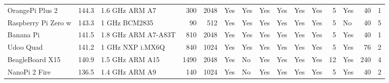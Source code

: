 \begin{table}
{\begin{tabular}{lrlrrllllllrlrr}
    OrangePi Plus 2 & \cellcolor[rgb]{ .914,  .898,  .514}144.3 & 1.6 GHz ARM A7 & 300   & 2048  & \cellcolor[rgb]{ .573,  .816,  .314}Yes & \cellcolor[rgb]{ .573,  .816,  .314}Yes & \cellcolor[rgb]{ .573,  .816,  .314}Yes & \cellcolor[rgb]{ .573,  .816,  .314}Yes & \cellcolor[rgb]{ .573,  .816,  .314}Yes & \cellcolor[rgb]{ .573,  .816,  .314}Yes & 5     & \cellcolor[rgb]{ .573,  .816,  .314}Yes & 40    & 1 \\
    \rowcolor[rgb]{ .851,  .851,  .851} Raspberry Pi Zero w & \cellcolor[rgb]{ .941,  .906,  .518}143.3 & 1 GHz BCM2835 & 90    & 512   & \cellcolor[rgb]{ .573,  .816,  .314}Yes & \cellcolor[rgb]{ .573,  .816,  .314}Yes & \cellcolor[rgb]{ .573,  .816,  .314}Yes & \cellcolor[rgb]{ .573,  .816,  .314}Yes & \cellcolor[rgb]{ .573,  .816,  .314}Yes & \cellcolor[rgb]{ .573,  .816,  .314}Yes & 5     & No    & 40    & 5 \\
    Banana Pi & \cellcolor[rgb]{ .996,  .922,  .518}141.5 & 1.8 GHz ARM A7-A83T & 810   & 2048  & \cellcolor[rgb]{ .573,  .816,  .314}Yes & \cellcolor[rgb]{ .573,  .816,  .314}Yes & \cellcolor[rgb]{ .573,  .816,  .314}Yes & \cellcolor[rgb]{ .573,  .816,  .314}Yes & \cellcolor[rgb]{ .573,  .816,  .314}Yes & \cellcolor[rgb]{ .573,  .816,  .314}Yes & 5     & \cellcolor[rgb]{ .573,  .816,  .314}Yes & 40    & 1 \\
    \rowcolor[rgb]{ .851,  .851,  .851} Udoo Quad & \cellcolor[rgb]{ .996,  .918,  .514}141.2 & 1 GHz NXP i.MX6Q & 840   & 1024  & \cellcolor[rgb]{ .573,  .816,  .314}Yes & \cellcolor[rgb]{ .573,  .816,  .314}Yes & \cellcolor[rgb]{ .573,  .816,  .314}Yes & \cellcolor[rgb]{ .573,  .816,  .314}Yes & \cellcolor[rgb]{ .573,  .816,  .314}Yes & \cellcolor[rgb]{ .573,  .816,  .314}Yes & 5     & \cellcolor[rgb]{ .573,  .816,  .314}Yes & 76    & 2 \\
    BeagleBoard X15 & \cellcolor[rgb]{ .996,  .914,  .514}140.9 & 1.5 GHz ARM A15 & 1490  & 2048  & \cellcolor[rgb]{ .573,  .816,  .314}Yes & No    & \cellcolor[rgb]{ .573,  .816,  .314}Yes & \cellcolor[rgb]{ .573,  .816,  .314}Yes & \cellcolor[rgb]{ .573,  .816,  .314}Yes & \cellcolor[rgb]{ .573,  .816,  .314}Yes & 12    & \cellcolor[rgb]{ .573,  .816,  .314}Yes & 240   & 4 \\
    \rowcolor[rgb]{ .851,  .851,  .851} NanoPi 2 Fire & \cellcolor[rgb]{ .996,  .851,  .502}136.5 & 1.4 GHz ARM A9 & 140   & 1024  & \cellcolor[rgb]{ .573,  .816,  .314}Yes & No    & \cellcolor[rgb]{ .573,  .816,  .314}Yes & \cellcolor[rgb]{ .573,  .816,  .314}Yes & \cellcolor[rgb]{ .573,  .816,  .314}Yes & \cellcolor[rgb]{ .573,  .816,  .314}Yes & 5     & \cellcolor[rgb]{ .573,  .816,  .314}Yes & 40    & 2 \\

\end{tabular}}
\end{table}
